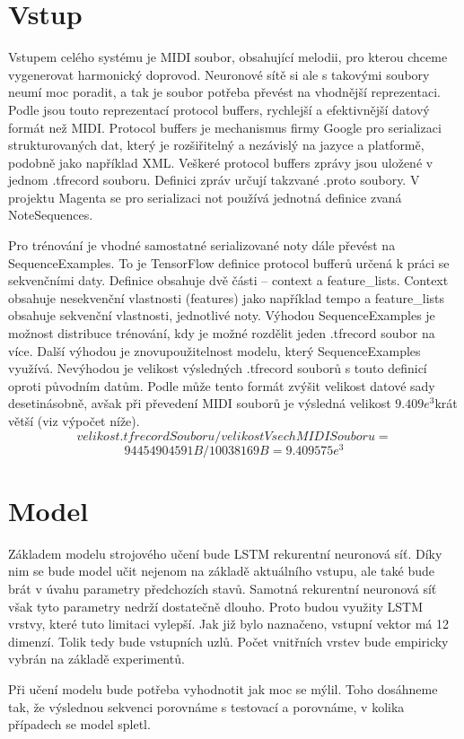 \section{Vstup}
Vstupem celého systému je MIDI soubor, obsahující melodii,
pro kterou chceme vygenerovat harmonický doprovod.
Neuronové sítě si ale s takovými soubory neumí moc poradit,
a tak je soubor potřeba převést na vhodnější reprezentaci.
Podle \cite{google_git_polyphony} jsou touto reprezentací protocol buffers,
rychlejší a efektivnější datový formát než MIDI.
Protocol buffers je mechanismus firmy Google pro serializaci strukturovaných dat,
který je rozšiřitelný a nezávislý na jazyce a platformě, podobně jako například XML.
Veškeré protocol buffers zprávy jsou uložené v jednom .tfrecord souboru.
Definici zpráv určují takzvané .proto soubory.\cite{google_ProtocolBuffers}
V projektu Magenta se pro serializaci not používá jednotná definice zvaná NoteSequences.\cite{google_musicColab}
\par
Pro trénování je vhodné samostatné serializované noty dále převést na SequenceExamples.\cite{google_git_polyphony}
To je TensorFlow definice protocol bufferů určená k práci se sekvenčními daty.
Definice obsahuje dvě části -- context a feature\_lists.
Context obsahuje nesekvenční vlastnosti (features) jako například tempo a 
feature\_lists obsahuje sekvenční vlastnosti, jednotlivé noty.
Výhodou SequenceExamples je možnost distribuce trénování, 
kdy je možné rozdělit jeden .tfrecord soubor na více.
Další výhodou je znovupoužitelnost modelu, který SequenceExamples využívá.
Nevýhodou je velikost výsledných .tfrecord souborů s touto definicí oproti původním datům. \cite{britz_undocumentedFeatures}
Podle \cite{britz_undocumentedFeatures} může tento formát zvýšit velikost datové sady desetinásobně,
avšak při převedení MIDI souborů je výsledná velikost $9.409e^3$krát větší (viz výpočet níže).
$$ velikost .tfrecord Souboru / velikost VsechMIDI Souboru =$$
$$94454904591B / 10038169B = 9.409575e^3$$

\section{Model}
Základem modelu strojového učení bude LSTM rekurentní neuronová síť.
Díky nim se bude model učit nejenom na základě aktuálního vstupu,
ale také bude brát v úvahu parametry předchozích stavů.
Samotná rekurentní neuronová síť však tyto parametry nedrží dostatečně dlouho.
Proto budou využity LSTM vrstvy, 
které tuto limitaci vylepší.
Jak již bylo naznačeno, 
vstupní vektor má 12 dimenzí.
Tolik tedy bude vstupních uzlů.
Počet vnitřních vrstev bude empiricky vybrán na základě experimentů.
\par
Při učení modelu bude potřeba vyhodnotit jak
 moc se mýlil.
Toho dosáhneme tak, že výslednou sekvenci porovnáme s
testovací a porovnáme, v kolika případech se model spletl.

